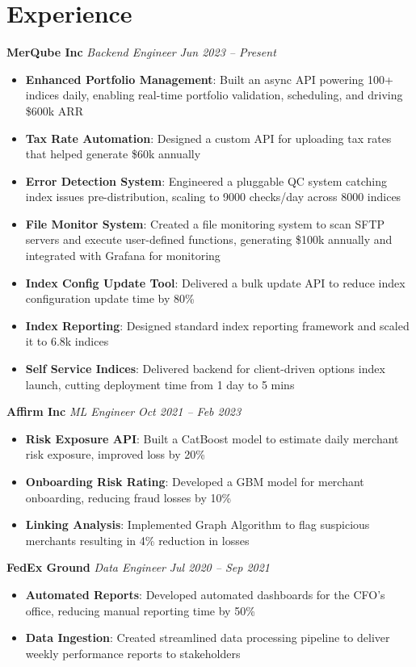 \documentclass[letterpaper,10pt]{article}
\begin{document}
\section*{Experience}
\textbf{{MerQube Inc}} \textit{{Backend Engineer}} \hfill \textit{{Jun 2023 -- Present}}
\begin{itemize}
    \item \textbf{{Enhanced Portfolio Management}}: Built an async API powering 100+ indices daily, enabling real-time portfolio validation, scheduling, and driving \$600k ARR
    \item \textbf{{Tax Rate Automation}}: Designed a custom API for uploading tax rates that helped generate \$60k annually
    \item \textbf{{Error Detection System}}: Engineered a pluggable QC system catching index issues pre-distribution, scaling to 9000 checks/day across 8000 indices
    \item \textbf{{File Monitor System}}: Created a file monitoring system to scan SFTP servers and execute user-defined functions, generating \$100k annually and integrated with Grafana for monitoring
    \item \textbf{{Index Config Update Tool}}: Delivered a bulk update API to reduce index configuration update time by 80\%
    \item \textbf{{Index Reporting}}: Designed standard index reporting framework and scaled it to 6.8k indices
    \item \textbf{{Self Service Indices}}: Delivered backend for client-driven options index launch, cutting deployment time from 1 day to 5 mins
\end{itemize}
\textbf{{Affirm Inc}} \textit{{ML Engineer}} \hfill \textit{{Oct 2021 -- Feb 2023}}
\begin{itemize}
    \item \textbf{{Risk Exposure API}}: Built a CatBoost model to estimate daily merchant risk exposure, improved loss by 20\%
    \item \textbf{{Onboarding Risk Rating}}: Developed a GBM model for merchant onboarding, reducing fraud losses by 10\%
    \item \textbf{{Linking Analysis}}: Implemented Graph Algorithm to flag suspicious merchants resulting in 4\% reduction in losses
\end{itemize}
\textbf{{FedEx Ground}} \textit{{Data Engineer}} \hfill \textit{{Jul 2020 -- Sep 2021}}
\begin{itemize}
    \item \textbf{{Automated Reports}}: Developed automated dashboards for the CFO’s office, reducing manual reporting time by 50\%
    \item \textbf{{Data Ingestion}}: Created streamlined data processing pipeline to deliver weekly performance reports to stakeholders
\end{itemize}
\end{document}
